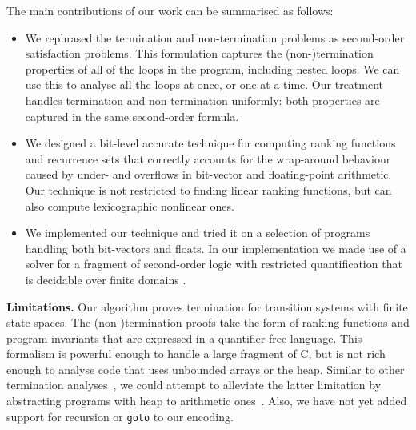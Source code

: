 \documentclass[a4paper]{llncs}
\begin{document}
The main contributions of our work can be summarised as follows:
%
\begin{itemize}

\item  We rephrased the termination and non-termination problems as
second-order %
satisfaction problems.  This formulation
captures the (non-)termination
properties of all of the loops in the program, including
nested loops.  We can use this to analyse all the loops at once,
or one at a time.  Our treatment handles termination and non-termination uniformly:
both properties are captured in the same second-order formula.	

\item We designed a bit-level accurate technique for computing ranking
functions and recurrence sets that correctly accounts for the wrap-around
behaviour caused by under- and overflows in bit-vector and floating-point arithmetic.  Our
technique is not restricted to finding linear ranking functions, but can
also compute lexicographic nonlinear ones.







\item We implemented our technique and tried it on a selection of programs
handling both bit-vectors and floats. In our implementation we made use of 
a solver for a fragment of second-order logic with restricted quantification that is decidable 
over finite domains \cite{kalashnikov}. 

\end{itemize} 

\noindent
{\bf Limitations.} Our algorithm proves termination for transition systems
with finite state spaces.  The (non-)termination proofs take the form of
ranking functions and program invariants that are expressed in a
quantifier-free language.  This formalism is powerful enough to handle a
large fragment of C, but is not rich enough to analyse code that uses
unbounded arrays or the heap.  Similar to other termination
analyses~\cite{DBLP:conf/tacas/CookSZ13}, we could attempt to alleviate the
latter limitation by abstracting programs with heap to arithmetic
ones~\cite{DBLP:conf/popl/MagillTLT10}.  Also, we have not yet added support
for recursion or \texttt{goto} to our encoding.
\end{document}

